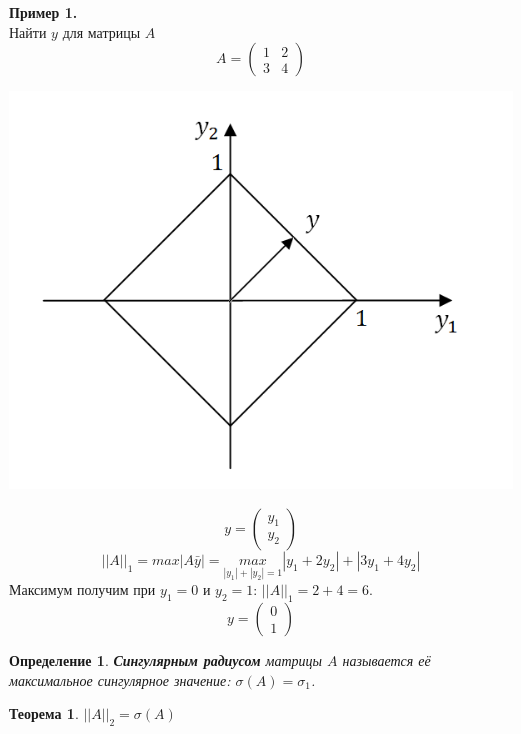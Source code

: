 \documentclass[12pt]{article}
\newtheorem*{definition}{Определение}
\newtheorem*{theorem}{Теорема}
\begin{document}
	\textbf{Пример 1.}\\
	Найти $y$ для матрицы $A$ \[A=\begin{pmatrix}
	1 & 2\\
	3 & 4
	\end{pmatrix}\]
	\begin{center}
		\includegraphics[scale=0.6]{l8_1.png}\end{center}
	\[y=\begin{pmatrix}
	y_1\\
	y_2
	\end{pmatrix}\]
	$$||A||_1=max|A \bar y|=\underset{|y_1|+|y_2|=1}{max}|y_1+2y_2|+|3y_1+4y_2|$$
	Максимум получим при $y_1=0$ и $y_2=1$: $||A||_1=2+4=6$.
	\[y=\begin{pmatrix}
	0\\
	1
	\end{pmatrix}\]
	\begin{definition}
		\textbf{Сингулярным радиусом} матрицы $A$ называется её максимальное сингулярное значение: $\sigma(A) = \sigma_1$.
	\end{definition}
	\begin{theorem}
		$||A||_2=\sigma(A)$
	\end{theorem}
\end{document}
